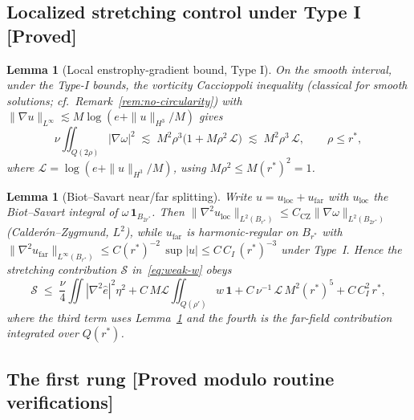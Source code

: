 \documentclass[11pt]{article}
\newtheorem{lemma}[theorem]{Lemma}
\theoremstyle{definition}
\theoremstyle{remark}
\begin{document}
\subsection{Localized stretching control under Type I [Proved]}

\begin{lemma}[Local enstrophy-gradient bound, Type I]\label{lem:local-enstrophy-typeI}
  On the smooth interval, under the Type-I bounds, the vorticity Caccioppoli
  inequality (classical for smooth solutions; cf.\
  Remark~\ref{rem:no-circularity}) with
  $\|\nabla u\|_{L^\infty}\lesssim M\log(e+\|u\|_{H^3}/M)$ gives
  \[
    \nu\iint_{Q(2\rho)}|\nabla\omega|^2
    \;\lesssim\; M^2\rho^3\bigl(1 + M\rho^2\,\mathcal{L}\bigr)
    \;\lesssim\; M^2\rho^3\,\mathcal{L},
    \qquad \rho\leq r^*,
  \]
  where $\mathcal{L} = \log(e+\|u\|_{H^3}/M)$, using $M\rho^2\leq M (r^*)^2=1$.
\end{lemma}

\begin{lemma}[Biot--Savart near/far splitting]\label{lem:BS-split}
  Write $u = u_{\mathrm{loc}} + u_{\mathrm{far}}$ with
  $u_{\mathrm{loc}}$ the Biot--Savart integral of
  $\omega\,\mathbf{1}_{B_{2r^*}}$. Then
  $\|\nabla^2 u_{\mathrm{loc}}\|_{L^2(B_{r^*})}
   \leq C_{\mathrm{CZ}}\|\nabla\omega\|_{L^2(B_{2r^*})}$
  (Calder\'on--Zygmund, $L^2$), while $u_{\mathrm{far}}$ is harmonic-regular
  on $B_{r^*}$ with
  $\|\nabla^2 u_{\mathrm{far}}\|_{L^\infty(B_{r^*})}
   \leq C (r^*)^{-2}\,\sup|u| \leq C\,C_I\,(r^*)^{-3}$
  under Type~I. Hence the stretching contribution $\mathcal{S}$
  in~\eqref{eq:weak-w} obeys
  \[
    \mathcal{S} \;\leq\; \frac{\nu}{4}\iint|\nabla^2\hat{e}|^2\eta^2
    + C\,M\mathcal{L}\iint_{Q(\rho')} w\,\mathbf{1}
    + C\,\nu^{-1}\,\mathcal{L}\,M^2(r^*)^5
    + C\,C_I^2\,r^*,
  \]
  where the third term uses Lemma~\ref{lem:local-enstrophy-typeI} and the
  fourth is the far-field contribution integrated over $Q(r^*)$.
\end{lemma}

\subsection{The first rung [Proved modulo routine verifications]}
\end{document}
